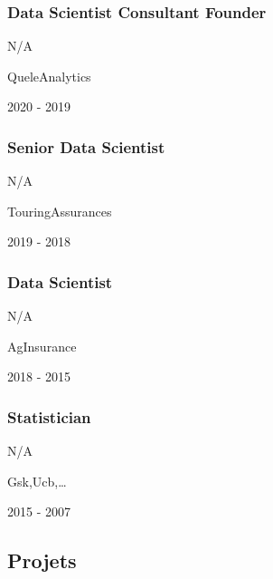 \documentclass[]{article}
\begin{document}
\hypertarget{data-scientist-consultant-founder}{%
\subsubsection{Data Scientist\textbar{} Consultant\textbar{}
Founder}\label{data-scientist-consultant-founder}}

N/A

QueleAnalytics

2020 - 2019

\hypertarget{senior-data-scientist}{%
\subsubsection{Senior Data Scientist}\label{senior-data-scientist}}

N/A

TouringAssurances

2019 - 2018

\hypertarget{data-scientist}{%
\subsubsection{Data Scientist}\label{data-scientist}}

N/A

AgInsurance

2018 - 2015

\hypertarget{statistician}{%
\subsubsection{Statistician}\label{statistician}}

N/A

Gsk,Ucb,\ldots{}

2015 - 2007

\hypertarget{projets}{%
\subsection{Projets}\label{projets}}
\end{document}
